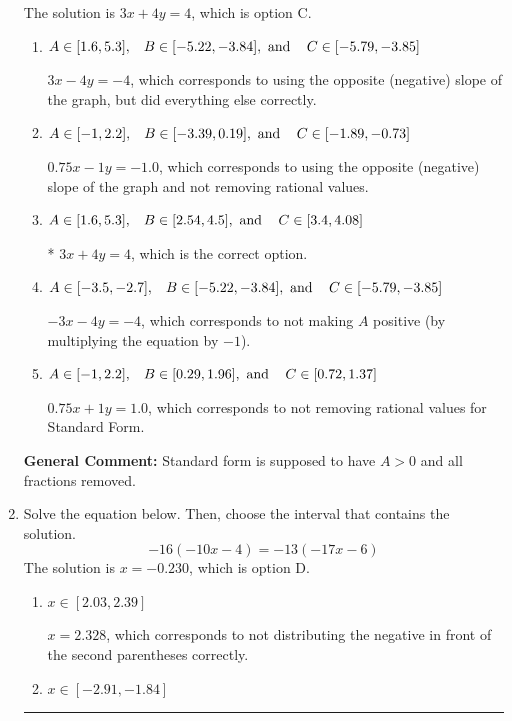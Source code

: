\documentclass{extbook}[14pt]
\newcommand{\litem}[1]{\item #1

\rule{\textwidth}{0.4pt}}
\begin{document}
\begin{enumerate}
{The solution is \( 3x + 4y = 4 \), which is option C.\begin{enumerate}[label=\Alph*.]
\item \( A \in [1.6, 5.3], \hspace{3mm} B \in [-5.22, -3.84], \text{ and } \hspace{3mm} C \in [-5.79, -3.85] \)

 $3x - 4y = -4$, which corresponds to using the opposite (negative) slope of the graph, but did everything else correctly.
\item \( A \in [-1, 2.2], \hspace{3mm} B \in [-3.39, 0.19], \text{ and } \hspace{3mm} C \in [-1.89, -0.73] \)

 $0.75x - 1y = -1.0$, which corresponds to using the opposite (negative) slope of the graph and not removing rational values.
\item \( A \in [1.6, 5.3], \hspace{3mm} B \in [2.54, 4.5], \text{ and } \hspace{3mm} C \in [3.4, 4.08] \)

* $3x + 4y = 4$, which is the correct option.
\item \( A \in [-3.5, -2.7], \hspace{3mm} B \in [-5.22, -3.84], \text{ and } \hspace{3mm} C \in [-5.79, -3.85] \)

 $-3x - 4y = -4$, which corresponds to not making $A$ positive (by multiplying the equation by $-1$).
\item \( A \in [-1, 2.2], \hspace{3mm} B \in [0.29, 1.96], \text{ and } \hspace{3mm} C \in [0.72, 1.37] \)

 $0.75x + 1y = 1.0$, which corresponds to not removing rational values for Standard Form.
\end{enumerate}

\textbf{General Comment:} Standard form is supposed to have $A > 0$ and all fractions removed.
}
\litem{
Solve the equation below. Then, choose the interval that contains the solution.
\[ -16(-10x -4) = -13(-17x -6) \]The solution is \( x = -0.230 \), which is option D.\begin{enumerate}[label=\Alph*.]
\item \( x \in [2.03, 2.39] \)

$x = 2.328$, which corresponds to not distributing the negative in front of the second parentheses correctly.
\item \( x \in [-2.91, -1.84] \)


\end{enumerate}}
\end{enumerate}
\end{document}
